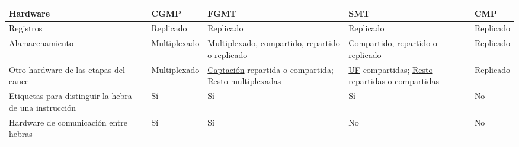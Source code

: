 \begin{center}
\begin{tabular}{p{4.5cm} p{2cm} p{3.25cm} p{3.25cm} p{1.75cm}}
\textbf{Hardware}                                     & \textbf{CGMP} & \textbf{FGMT}                                                                 & \textbf{SMT}                                                           & \textbf{CMP} \\
\toprule
Registros                                             & Replicado     & Replicado                                                                     & Replicado                                                              & Replicado    \\
Alamacenamiento                                       & Multiplexado  & Multiplexado, compartido, repartido o replicado                               & Compartido, repartido o replicado                                      & Replicado                            \\
Otro hardware de las etapas del cauce                 & Multiplexado  & \underline{Captación} repartida o compartida; \underline{Resto} multiplexadas & \underline{UF} compartidas; \underline{Resto} repartidas o compartidas & Replicado                                \\
Etiquetas para distinguir la hebra de una instrucción & Sí            & Sí                                                                            & Sí                                                                     & No           \\
Hardware de comunicación entre hebras                 & Sí            & Sí                                                                            & No                                                                     & No           \\
\end{tabular}
\end{center}

